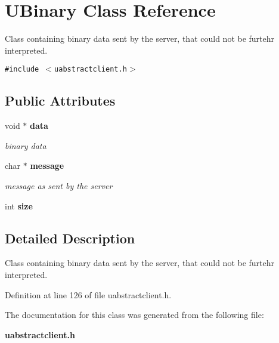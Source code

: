 \section{UBinary Class Reference}
\label{classUBinary}
Class containing binary data sent by the server, that could not be furtehr interpreted.  


{\tt \#include $<$uabstractclient.h$>$}

\subsection*{Public Attributes}
\begin{CompactItemize}
\item 
void $\ast$ {\bf data}\label{classUBinary_o0}

\begin{CompactList}\small\item\em binary data \item\end{CompactList}\item 
char $\ast$ {\bf message}\label{classUBinary_o1}

\begin{CompactList}\small\item\em message as sent by the server \item\end{CompactList}\item 
int {\bf size}\label{classUBinary_o2}

\end{CompactItemize}


\subsection{Detailed Description}
Class containing binary data sent by the server, that could not be furtehr interpreted. 



Definition at line 126 of file uabstractclient.h.

The documentation for this class was generated from the following file:\begin{CompactItemize}
\item 
{\bf uabstractclient.h}\end{CompactItemize}
